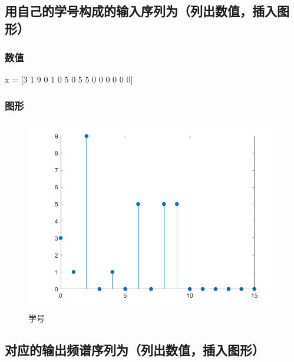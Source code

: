 \documentclass{../source/zjureport}
\begin{document}
        \subsection{用自己的学号构成的输入序列为（列出数值，插入图形）}
            \subsubsection{数值}
            x = [3 1 9 0 1 0 5 0 5 5 0 0 0 0 0 0]
            \subsubsection{图形}
            \begin{figure}[H]
                \centering
                \includegraphics[scale = 0.5]{figure/学号.png}
                \caption{学号}
            \end{figure}

        \subsection{对应的输出频谱序列为（列出数值，插入图形）}
\end{document}
